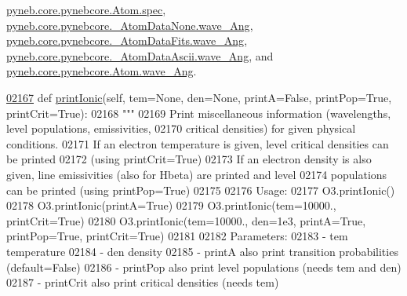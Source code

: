 \hyperlink{pynebcore_8py_source_l01166}{pyneb.\+core.\+pynebcore.\+Atom.\+spec}, \hyperlink{pynebcore_8py_source_l00057}{pyneb.\+core.\+pynebcore.\+\_\+\+Atom\+Data\+None.\+wave\+\_\+\+Ang}, \hyperlink{pynebcore_8py_source_l00165}{pyneb.\+core.\+pynebcore.\+\_\+\+Atom\+Data\+Fits.\+wave\+\_\+\+Ang}, \hyperlink{pynebcore_8py_source_l00426}{pyneb.\+core.\+pynebcore.\+\_\+\+Atom\+Data\+Ascii.\+wave\+\_\+\+Ang}, and \hyperlink{pynebcore_8py_source_l01198}{pyneb.\+core.\+pynebcore.\+Atom.\+wave\+\_\+\+Ang}.


\begin{DoxyCode}
\hypertarget{classpyneb_1_1core_1_1pynebcore_1_1_atom_l02167}{}\hyperlink{classpyneb_1_1core_1_1pynebcore_1_1_atom_a4be768ed1460bb448207b470551ef2ed}{02167}     \textcolor{keyword}{def }\hyperlink{classpyneb_1_1core_1_1pynebcore_1_1_atom_a4be768ed1460bb448207b470551ef2ed}{printIonic}(self, tem=None, den=None, printA=False, printPop=True, printCrit=True):
02168         \textcolor{stringliteral}{""" }
02169 \textcolor{stringliteral}{        Print miscellaneous information (wavelengths, level populations, emissivities, }
02170 \textcolor{stringliteral}{            critical densities) for given physical conditions.}
02171 \textcolor{stringliteral}{        If an electron temperature is given, level critical densities can be printed }
02172 \textcolor{stringliteral}{            (using printCrit=True)}
02173 \textcolor{stringliteral}{        If an electron density is also given, line emissivities (also for Hbeta) are printed and level }
02174 \textcolor{stringliteral}{            populations can be printed (using printPop=True)}
02175 \textcolor{stringliteral}{        }
02176 \textcolor{stringliteral}{        Usage:}
02177 \textcolor{stringliteral}{            O3.printIonic()}
02178 \textcolor{stringliteral}{            O3.printIonic(printA=True)}
02179 \textcolor{stringliteral}{            O3.printIonic(tem=10000., printCrit=True)}
02180 \textcolor{stringliteral}{            O3.printIonic(tem=10000., den=1e3, printA=True, printPop=True, printCrit=True)}
02181 \textcolor{stringliteral}{}
02182 \textcolor{stringliteral}{        Parameters:}
02183 \textcolor{stringliteral}{            - tem          temperature}
02184 \textcolor{stringliteral}{            - den          density}
02185 \textcolor{stringliteral}{            - printA       also print transition probabilities (default=False)}
02186 \textcolor{stringliteral}{            - printPop     also print level populations (needs tem and den)}
02187 \textcolor{stringliteral}{            - printCrit    also print critical densities (needs tem)}

\end{DoxyCode}
